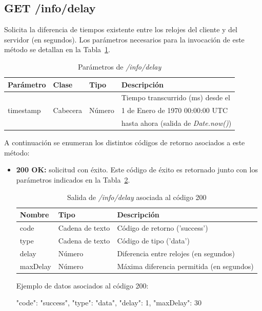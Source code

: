 %
%
\subsection{GET /info/delay}
Solicita la diferencia de tiempos existente entre los relojes del cliente y del servidor (en segundos).
Los parámetros necesarios para la invocación de este método se detallan en la Tabla~\ref{extra:api:infodelay:invocacion}.

\begin{table}[H]
\centering
\begin{tabular}{|l|l|l|l|}
\hline
\rowcolor[HTML]{F5F5F5}
\textbf{Parámetro}  & \textbf{Clase} & \textbf{Tipo}   & \textbf{Descripción}                         \\ \hline
                    &                &                 & Tiempo transcurrido (ms) desde el            \\
timestamp           & Cabecera       & Número          & 1 de Enero de 1970 00:00:00 UTC              \\
                    &                &                 & hasta ahora (salida de \textit{Date.now()})  \\ \hline
\end{tabular}
\caption{Parámetros de \textit{/info/delay}}
\label{extra:api:infodelay:invocacion}
\end{table}

A continuación se enumeran los distintos códigos de retorno asociados a este método:
\begin{itemize}

\item{\textbf{200 OK:} solicitud con éxito.
Este código de éxito es retornado junto con los parámetros indicados en la Tabla~\ref{extra:api:infodelay:ok}.
\begin{table}[H]
\centering
\begin{tabular}{|l|l|l|}
\hline
\rowcolor[HTML]{F5F5F5}
\textbf{Nombre}  & \textbf{Tipo}   & \textbf{Descripción}                      \\ \hline
code             & Cadena de texto & Código de retorno ('success')             \\ \hline
type             & Cadena de texto & Código de tipo ('data')                   \\ \hline
delay            & Número          & Diferencia entre relojes (en segundos)    \\ \hline
maxDelay         & Número          & Máxima diferencia permitida (en segundos) \\ \hline
\end{tabular}
\caption{Salida de \textit{/info/delay} asociada al código 200}
\label{extra:api:infodelay:ok}
\end{table}
\begin{minipage}{\textwidth}
Ejemplo de datos asociados al código 200:

\begin{code}[language=json]
 {
   "code": "success",
   "type": "data",
   "delay": 1,
   "maxDelay": 30
 }
\end{code}
\end{minipage}
}

\end{itemize}

